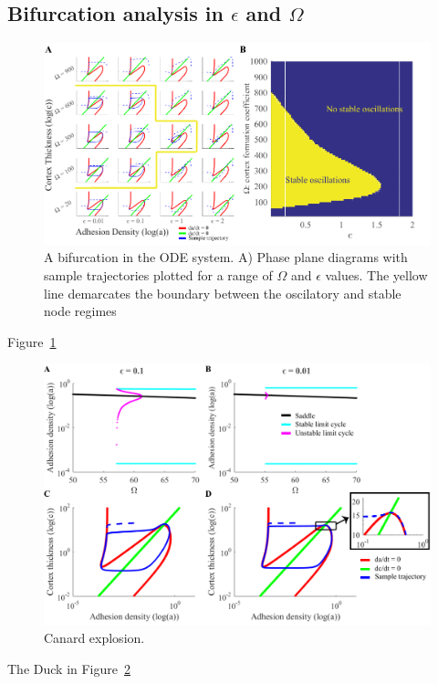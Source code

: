 \subsection{Bifurcation analysis in $\epsilon$ and $\Omega$}

\begin{figure}[htbp]
  \centering
  \label{fig:2DBifurcation}\includegraphics[width=13cm]{figs/2DBifurcation.pdf}
  \caption{A bifurcation in the ODE system. A) Phase plane diagrams with sample trajectories plotted for a range of $\Omega$ and $\epsilon$ values. The yellow line demarcates the boundary between the oscilatory and stable node regimes }
\end{figure}
Figure~\ref{fig:2DBifurcation}

\begin{figure}[htbp]
  \centering
  \label{fig:canard}\includegraphics[width=13cm]{figs/figCanard.pdf}
  \caption{Canard explosion.}
\end{figure}
The Duck in Figure~\ref{fig:canard}
